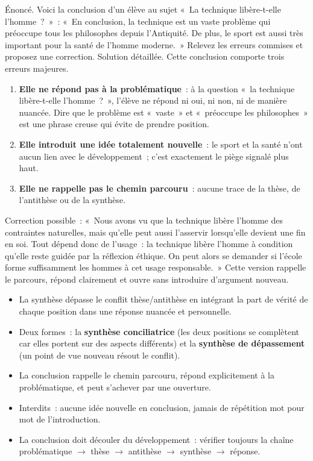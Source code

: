 \documentclass[11pt]{article}
\newcommand{\cle}[1]{{\popxbold\color{popdark}#1}}
\begin{document}
\begin{exoresolu}
Énoncé. Voici la conclusion d'un élève au sujet «~La technique libère-t-elle l'homme~?~»~: «~En conclusion, la technique est un vaste problème qui préoccupe tous les philosophes depuis l'Antiquité. De plus, le sport est aussi très important pour la santé de l'homme moderne.~» Relevez les erreurs commises et proposez une correction.
\tcblower
Solution détaillée. Cette conclusion comporte trois erreurs majeures.
\begin{enumerate}
\item \textbf{Elle ne répond pas à la problématique}~: à la question «~la technique libère-t-elle l'homme~?~», l'élève ne répond ni oui, ni non, ni de manière nuancée. Dire que le problème est «~vaste~» et «~préoccupe les philosophes~» est une phrase creuse qui évite de prendre position.
\item \textbf{Elle introduit une idée totalement nouvelle}~: le sport et la santé n'ont aucun lien avec le développement~; c'est exactement le piège signalé plus haut.
\item \textbf{Elle ne rappelle pas le chemin parcouru}~: aucune trace de la thèse, de l'antithèse ou de la synthèse.
\end{enumerate}
Correction possible~: «~Nous avons vu que la technique libère l'homme des contraintes naturelles, mais qu'elle peut aussi l'asservir lorsqu'elle devient une fin en soi. Tout dépend donc de l'usage~: la technique libère l'homme à condition qu'elle reste guidée par la réflexion éthique. On peut alors se demander si l'école forme suffisamment les hommes à cet usage responsable.~» Cette version rappelle le parcours, répond clairement et ouvre sans introduire d'argument nouveau.
\end{exoresolu}

\begin{aretenir}
\begin{itemize}
\item La \cle{synthèse} dépasse le conflit thèse/antithèse en intégrant la part de vérité de chaque position dans une réponse nuancée et personnelle.
\item Deux formes~: la \textbf{synthèse conciliatrice} (les deux positions se complètent car elles portent sur des aspects différents) et la \textbf{synthèse de dépassement} (un point de vue nouveau résout le conflit).
\item La \cle{conclusion} rappelle le chemin parcouru, répond explicitement à la problématique, et peut s'achever par une ouverture.
\item Interdits~: aucune idée nouvelle en conclusion, jamais de répétition mot pour mot de l'introduction.
\item La conclusion doit découler du développement~: vérifier toujours la chaîne problématique $\rightarrow$ thèse $\rightarrow$ antithèse $\rightarrow$ synthèse $\rightarrow$ réponse.
\end{itemize}
\end{aretenir}
\end{document}
